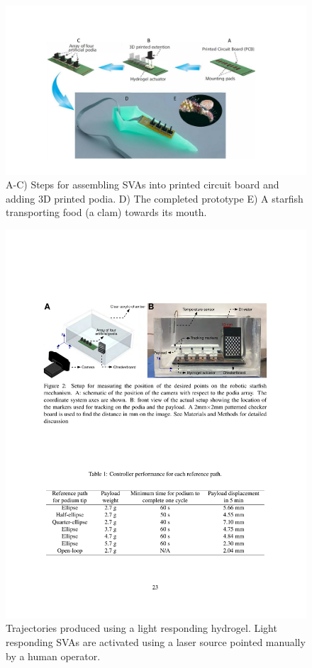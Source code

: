 \begin{figure}[!th]
      \centering
      \includegraphics[width=1\textwidth]{starfish.pdf}
      \caption[]{A-C) Steps for assembling SVAs into printed circuit board and adding 3D printed podia. D) The completed prototype E) A starfish transporting food (a clam) towards its mouth.}
      \label{fig:starfish}
\end{figure}


\begin{figure}[!th]
      \centering
      \includegraphics[width=1\textwidth]{setupCheckerboard.pdf}
      \caption[]{Trajectories produced using a light responding hydrogel. Light responding SVAs are activated using a laser source pointed manually by a human operator.}
      \label{fig:setupCheckerboard}
\end{figure}

